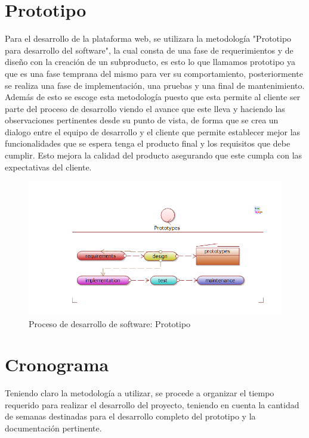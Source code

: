 \section{Prototipo}
Para el desarrollo de la plataforma web, se utilizara la metodología "Prototipo para desarrollo del software", la cual consta de una fase de requerimientos y de diseño con la creación de un subproducto, es esto lo que llamamos prototipo ya que es una fase temprana del mismo para ver su comportamiento, posteriormente se realiza una fase de implementación, una pruebas y una final de mantenimiento.
\newline
Además de esto se escoge esta metodología puesto que esta permite al cliente ser parte del proceso de desarrollo viendo el avance que este lleva y haciendo las observaciones pertinentes desde su punto de vista, de forma que se crea un dialogo entre el equipo de desarrollo y el cliente que permite establecer mejor las funcionalidades que se espera tenga el producto final y los requisitos que debe cumplir. Esto mejora la calidad del producto asegurando que este cumpla con las expectativas del cliente.
\begin{figure}[th!]
	\centering
	\includegraphics[width=0.9\linewidth]{imagenes/Proceso1}
	\caption{Proceso de desarrollo de software: Prototipo}
\end{figure}

\newpage

\section{Cronograma}

Teniendo claro la metodología a utilizar, se procede a organizar el tiempo requerido para realizar el desarrollo del proyecto, teniendo en cuenta la cantidad de semanas destinadas para el desarrollo completo del prototipo y la documentación pertinente.


\newpage